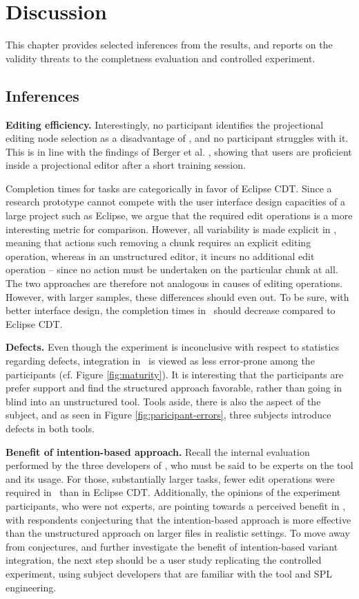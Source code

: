 \chapter{Discussion}
This chapter provides selected inferences from the results, and reports on the validity threats to the completness evaluation and controlled experiment.

\section{Inferences}
\textbf{Editing efficiency.} Interestingly, no participant identifies the projectional editing node selection as a disadvantage of \tooln, and no participant struggles with it. This is in line with the findings of Berger et al. \cite{berger2016mps}, showing that users are proficient inside a projectional editor after a short training session.

Completion times for tasks are categorically in favor of Eclipse CDT. Since a research prototype cannot compete with the user interface design capacities of a large project such as Eclipse, we argue that the required edit operations is a more interesting metric for comparison. However, all variability is made explicit in \tooln, meaning that actions such removing a chunk requires an explicit editing operation, whereas in an unstructured editor, it incurs no additional edit operation -- since no action must be undertaken on the particular chunk at all. The two approaches are therefore not analogous in causes of editing operations. However, with larger samples, these differences should even out. To be sure, with better interface design, the completion times in \tooln~should decrease compared to Eclipse CDT.

\textbf{Defects.} Even though the experiment is inconclusive with respect to statistics regarding defects, integration in \tooln~is viewed as less error-prone among the participants (cf. Figure \ref{fig:maturity}). It is interesting that the participants are prefer support and find the structured approach favorable, rather than going in blind into an unstructured tool. Tools aside, there is also the aspect of the subject, and as seen in Figure \ref{fig:paricipant-errors}, three subjects introduce defects in both tools.

\textbf{Benefit of intention-based approach.} Recall the internal evaluation performed by the three developers of \tooln, who must be said to be experts on the tool and its usage. For those, substantially larger tasks, fewer edit operations were required in \tooln~than in Eclipse CDT. Additionally, the opinions of the experiment participants, who were not experts, are pointing towards a perceived benefit in \tooln, with respondents conjecturing that the intention-based approach is more effective than the unstructured approach on larger files in realistic settings. To move away from conjectures, and further investigate the benefit of intention-based variant integration, the next step should be a user study replicating the controlled experiment, using subject developers that are familiar with the tool and SPL engineering.

